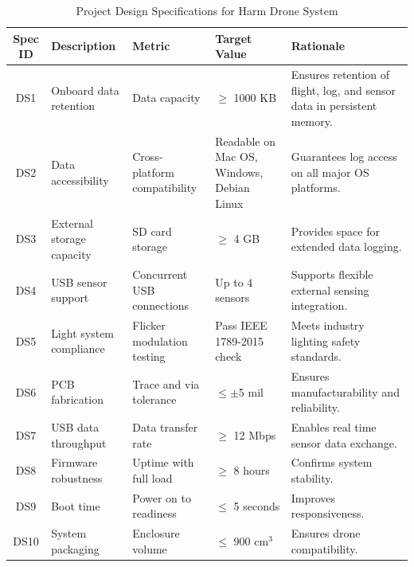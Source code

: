 \documentclass[12pt]{article}
\begin{document}
\begin{table}[H]
\centering
\begin{tabular}{|c|p{3cm}|p{3cm}|p{3cm}|p{4cm}|}
\hline
\textbf{Spec ID} & \textbf{Description} & \textbf{Metric} & \textbf{Target Value} & \textbf{Rationale} \\
\hline
DS1 & Onboard data retention & Data capacity & $\geq$ 1000 KB & Ensures retention of flight, log, and sensor data in persistent memory. \\
\hline
DS2 & Data accessibility & Cross-platform compatibility & Readable on Mac OS, Windows, Debian Linux & Guarantees log access on all major OS platforms. \\
\hline
DS3 & External storage capacity & SD card storage & $\geq$ 4 GB & Provides space for extended data logging. \\
\hline
DS4 & USB sensor support & Concurrent USB connections & Up to 4 sensors & Supports flexible external sensing integration. \\
\hline
DS5 & Light system compliance & Flicker modulation testing & Pass IEEE 1789-2015 check & Meets industry lighting safety standards. \\
\hline
DS6 & PCB fabrication & Trace and via tolerance & $\leq \pm$5 mil & Ensures manufacturability and reliability. \\
\hline
DS7 & USB data throughput & Data transfer rate & $\geq$ 12 Mbps & Enables real time sensor data exchange. \\
\hline
DS8 & Firmware robustness & Uptime with full load & $\geq$ 8 hours & Confirms system stability. \\
\hline
DS9 & Boot time & Power on to readiness & $\leq$ 5 seconds & Improves responsiveness. \\
\hline
DS10 & System packaging & Enclosure volume & $\leq$ 900 cm$^3$ & Ensures drone compatibility. \\
\hline
\end{tabular}
\caption{Project Design Specifications for Harm Drone System}
\end{table}
\end{document}
